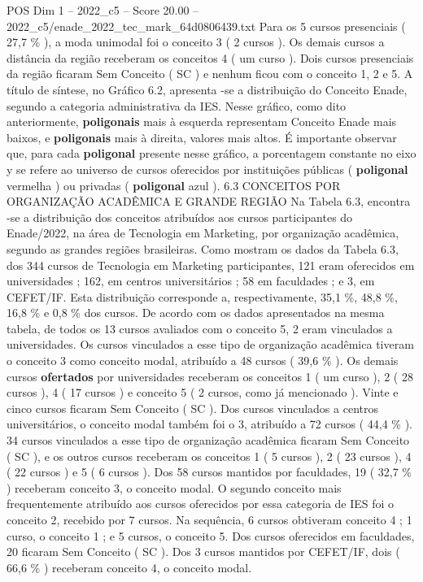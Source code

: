 \begin{textsample}{POS Dim 1 – 2022\_c5 – Score 20.00 – 2022\_c5/enade\_2022\_tec\_mark\_64d0806439.txt}
Para os 5 cursos presenciais ( 27,7 \% ), a moda unimodal foi o conceito 3 ( 2 cursos ).
Os demais cursos a distância da região receberam os conceitos 4 ( um curso ).
Dois cursos presenciais da região ficaram Sem Conceito ( SC ) e nenhum ficou com o conceito 1, 2 e 5.
A título de síntese, no Gráfico 6.2, apresenta -se a distribuição do Conceito Enade, segundo a categoria administrativa da IES.
Nesse gráfico, como dito anteriormente, \textbf{poligonais} mais à esquerda representam Conceito Enade mais baixos, e \textbf{poligonais} mais à direita, valores mais altos.
É importante observar que, para cada \textbf{poligonal} presente nesse gráfico, a porcentagem constante no eixo y se refere ao universo de cursos oferecidos por instituições públicas ( \textbf{poligonal} vermelha ) ou privadas ( \textbf{poligonal} azul ). 6.3 CONCEITOS POR ORGANIZAÇÃO ACADÊMICA E GRANDE REGIÃO Na Tabela 6.3, encontra -se a distribuição dos conceitos atribuídos aos cursos participantes do Enade/2022, na área de Tecnologia em Marketing, por organização acadêmica, segundo as grandes regiões brasileiras.
Como mostram os dados da Tabela 6.3, dos 344 cursos de Tecnologia em Marketing participantes, 121 eram oferecidos em universidades ; 162, em centros universitários ; 58 em faculdades ; e 3, em CEFET/IF.
Esta distribuição corresponde a, respectivamente, 35,1 \%, 48,8 \%, 16,8 \% e 0,8 \% dos cursos.
De acordo com os dados apresentados na mesma tabela, de todos os 13 cursos avaliados com o conceito 5, 2 eram vinculados a universidades.
Os cursos vinculados a esse tipo de organização acadêmica tiveram o conceito 3 como conceito modal, atribuído a 48 cursos ( 39,6 \% ).
Os demais cursos \textbf{ofertados} por universidades receberam os conceitos 1 ( um curso ), 2 ( 28 cursos ), 4 ( 17 cursos ) e conceito 5 ( 2 cursos, como já mencionado ).
Vinte e cinco cursos ficaram Sem Conceito ( SC ).
Dos cursos vinculados a centros universitários, o conceito modal também foi o 3, atribuído a 72 cursos ( 44,4 \% ). 34 cursos vinculados a esse tipo de organização acadêmica ficaram Sem Conceito ( SC ), e os outros cursos receberam os conceitos 1 ( 5 cursos ), 2 ( 23 cursos ), 4 ( 22 cursos ) e 5 ( 6 cursos ).
Dos 58 cursos mantidos por faculdades, 19 ( 32,7 \% ) receberam conceito 3, o conceito modal.
O segundo conceito mais frequentemente atribuído aos cursos oferecidos por essa categoria de IES foi o conceito 2, recebido por 7 cursos.
Na sequência, 6 cursos obtiveram conceito 4 ; 1 curso, o conceito 1 ; e 5 cursos, o conceito 5.
Dos cursos oferecidos em faculdades, 20 ficaram Sem Conceito ( SC ).
Dos 3 cursos mantidos por CEFET/IF, dois ( 66,6 \% ) receberam conceito 4, o conceito modal.

\end{textsample}
